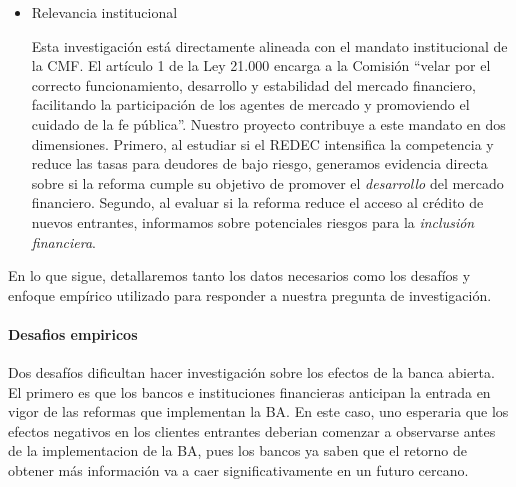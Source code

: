 \documentclass[11pt]{article}
\theoremstyle{plain}
\theoremstyle{plain}
\begin{document}
\begin{itemize}
    \item Relevancia institucional %
    
Esta investigación está directamente alineada con el mandato institucional de la CMF. El artículo 1 de la Ley 21.000 encarga a la Comisión ``velar por el correcto funcionamiento, desarrollo y estabilidad del mercado financiero, facilitando la participación de los agentes de mercado y promoviendo el cuidado de la fe pública''. Nuestro proyecto contribuye a este mandato en dos dimensiones. Primero, al estudiar si el REDEC intensifica la competencia y reduce las tasas para deudores de bajo riesgo, generamos evidencia directa sobre si la reforma cumple su objetivo de promover el \textit{desarrollo} del mercado financiero. Segundo, al evaluar si la reforma reduce el acceso al crédito de nuevos entrantes, informamos sobre potenciales riesgos para la \textit{inclusión financiera}.


\end{itemize}








 





En lo que sigue, detallaremos tanto los datos necesarios como los desafíos y enfoque empírico utilizado para responder a nuestra pregunta de investigación.

\newpage






\paragraph{Desafios empiricos}

Dos desafíos dificultan hacer investigación sobre los efectos de la banca abierta. El primero es que los bancos e instituciones financieras anticipan la entrada en vigor de las reformas que implementan la BA.
En este caso, uno esperaria que los efectos negativos en los clientes entrantes deberian comenzar a observarse antes de la implementacion de la BA, pues los bancos ya saben que el retorno de obtener más información va a caer significativamente en un futuro cercano. 
\end{document}
